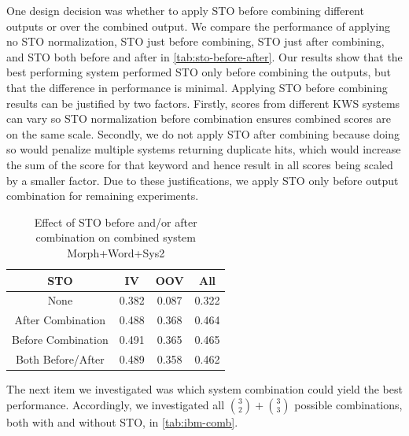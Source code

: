 \documentclass[a4paper,oneside,reqno]{amsart}
\begin{document}
One design decision was whether to apply STO before combining different outputs
or over the combined output. We compare the performance of applying no STO normalization,
STO just before combining, STO just after combining, and STO both before and after in
\autoref{tab:sto-before-after}. Our results show that the best performing system
performed STO only before combining the outputs, but that the difference in performance
is minimal. Applying STO before combining results can be justified by two
factors. Firstly, scores from different KWS systems can vary so STO
normalization before combination ensures combined scores are on the same scale.
Secondly, we do not apply STO after combining because doing so would penalize multiple
systems returning duplicate hits, which would increase the sum of the score for
that keyword and hence result in all scores being scaled by a smaller factor.
Due to these justifications, we apply STO only before output combination for
remaining experiments.

\begin{table}[ht!]
  \begin{tabular}{cccc}
    \toprule
    STO                & IV    & OOV   & All \\
    \midrule
    None               & 0.382 & 0.087 & 0.322 \\
    After Combination  & 0.488 & 0.368 & 0.464 \\
    Before Combination & 0.491 & 0.365 & 0.465 \\
    Both Before/After  & 0.489 & 0.358 & 0.462 \\
    \bottomrule
  \end{tabular}
  \caption{Effect of STO before and/or after combination on combined system Morph+Word+Sys2}
  \label{tab:sto-before-after}
\end{table}

The next item we investigated was which system combination could yield the
best performance. Accordingly, we investigated all $\binom{3}{2} + \binom{3}{3}$
possible combinations, both with and without STO, in \autoref{tab:ibm-comb}.
\end{document}
